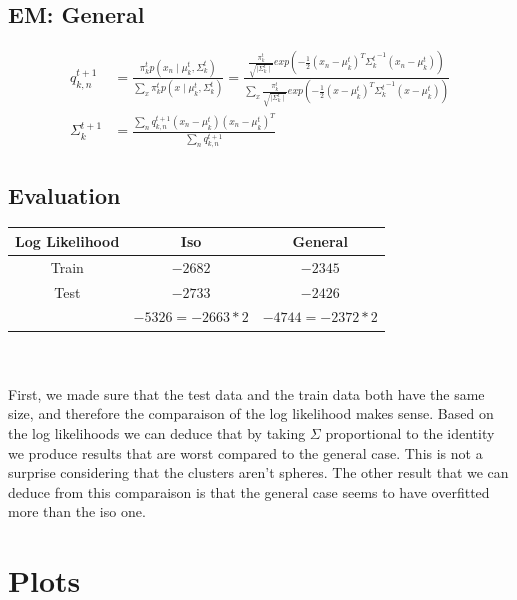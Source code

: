 \documentclass[a4paper]{article}
\begin{document}
\subsection{EM: General}
\begin{align*}
q^{t+1}_{k,n} &= \frac{\pi_k^t p(x_n \mid \mu_k^t, \Sigma_k^t)}{\sum_{x} \pi_k^t p(x \mid \mu_k^t, \Sigma_k^t)} =
\frac{\frac{\pi_k^t}{\sqrt{\mid \Sigma_k^t \mid}} exp(-\frac{1}{2}(x_n-\mu_k^t)^T {\Sigma_k^t}^{-1} (x_n - \mu_k^t))}{\sum_{x} \frac{\pi_k^t}{\sqrt{\mid \Sigma_k^t \mid}} exp(-\frac{1}{2}(x-\mu_k^t)^T{\Sigma_k^t}^{-1}(x-\mu_k^t))} \\
\Sigma_k^{t+1} &= \frac{\sum_n q^{t+1}_{k,n}(x_n-\mu_k^t)(x_n - \mu_k^t)^T}{\sum_n q^{t+1}_{k,n}}
\end{align*}
\subsection{Evaluation}
\begin{tabular}{|c|c|c|}
\hline 
Log Likelihood & Iso & General \\ 
\hline 
Train & $-2682$ & $-2345$ \\ 
\hline 
Test  & $-2733$ & $-2426$ \\
\hline
[Train,Test] & $-5326= -2663 * 2$ & $-4744=-2372*2$  \\
\hline 
\end{tabular}
\\\\
First, we made sure that the test data and the train data both have the same size, and therefore the comparaison of the log likelihood makes sense.
Based on the log likelihoods we can deduce that by taking $\Sigma$ proportional to the identity we produce results that are worst compared to the general case. This is not a surprise considering that the clusters aren't spheres. The other result that we can deduce from this comparaison is that the general case seems to have overfitted more than the iso one.
\newpage
\section{Plots}
\end{document}
